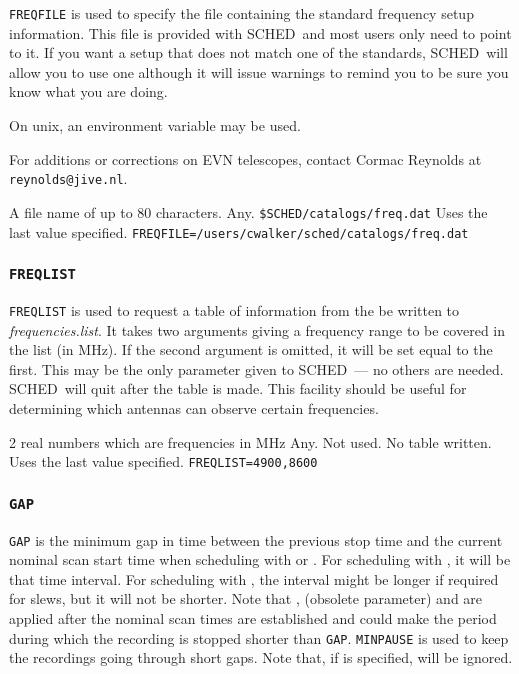 \documentclass{report}
\newcommand{\schedb}{{\sc SCHED~}}
\begin{document}
{\tt FREQFILE} is used to specify the file containing the standard
frequency setup information.  This file is provided with \schedb and
most users only need to point to it.  If you want a setup that does
not match one of the standards, \schedb will allow you to use one
although it will issue warnings to remind you to be sure you know what
you are doing.

On unix, an environment variable may be used.

For additions or corrections on EVN telescopes, contact
Cormac Reynolds at {\tt reynolds@jive.nl}.


{A file name of up to 80 characters.}
{Any.}
{{\tt \$SCHED/catalogs/freq.dat}}
{Uses the last value specified.}
{{\tt FREQFILE=/users/cwalker/sched/catalogs/freq.dat}}


\subsubsection{\label{MP:FREQLIST}{\tt FREQLIST}}

{\tt FREQLIST} is used to request a table of information from the
 be written to {\sl
frequencies.list}.  It takes two arguments giving a frequency range to
be covered in the list (in MHz).  If the second argument is omitted,
it will be set equal to the first.  This may be the only parameter
given to \schedb --- no others are needed.  \schedb will quit after
the table is made.  This facility should be useful for determining
which antennas can observe certain frequencies.

{2 real numbers which are frequencies in MHz}
{Any.}
{Not used.  No table written.}
{Uses the last value specified.}
{{\tt FREQLIST=4900,8600}}


\subsubsection{\label{MP:GAP}{\tt GAP}}

{\tt GAP} is the minimum gap in time between the previous stop time
and the current nominal scan start time when scheduling with
 or .
For scheduling with , it will be that
time interval.  For scheduling with ,
the interval might be longer if required for slews, but it will not be
shorter.  Note that ,
 (obsolete parameter) and
 are applied after the nominal
scan times are established and could make the period during which the
recording is stopped shorter than {\tt GAP}.  {\tt MINPAUSE} is used
to keep the recordings going through short gaps.  Note that, if
 is specified,  will be ignored.
\end{document}
